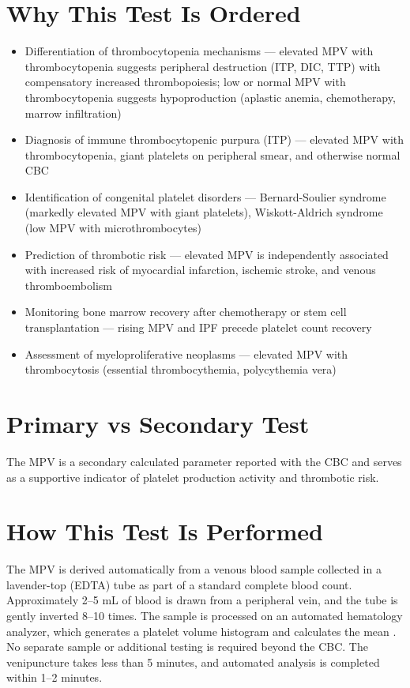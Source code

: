 \section*{Why This Test Is Ordered}
\begin{itemize}
  \item Differentiation of thrombocytopenia mechanisms --- elevated MPV with thrombocytopenia suggests peripheral destruction (ITP, DIC, TTP) with compensatory increased thrombopoiesis; low or normal MPV with thrombocytopenia suggests hypoproduction (aplastic anemia, chemotherapy, marrow infiltration)
  \item Diagnosis of immune thrombocytopenic purpura (ITP) --- elevated MPV with thrombocytopenia, giant platelets on peripheral smear, and otherwise normal CBC
  \item Identification of congenital platelet disorders --- Bernard-Soulier syndrome (markedly elevated MPV with giant platelets), Wiskott-Aldrich syndrome (low MPV with microthrombocytes)
  \item Prediction of thrombotic risk --- elevated MPV is independently associated with increased risk of myocardial infarction, ischemic stroke, and venous thromboembolism \cite{sansanayudh2014mean}
  \item Monitoring bone marrow recovery after chemotherapy or stem cell transplantation --- rising MPV and IPF precede platelet count recovery
  \item Assessment of myeloproliferative neoplasms --- elevated MPV with thrombocytosis (essential thrombocythemia, polycythemia vera)
\end{itemize}

\section*{Primary vs Secondary Test}
The MPV is a secondary calculated parameter reported with the CBC and serves as a supportive indicator of platelet production activity and thrombotic risk.

\section*{How This Test Is Performed}
The MPV is derived automatically from a venous blood sample collected in a lavender-top (EDTA) tube as part of a standard complete blood count. Approximately 2--5 mL of blood is drawn from a peripheral vein, and the tube is gently inverted 8--10 times. The sample is processed on an automated hematology analyzer, which generates a platelet volume histogram and calculates the mean \cite{fischbach2023manual}. No separate sample or additional testing is required beyond the CBC. The venipuncture takes less than 5 minutes, and automated analysis is completed within 1--2 minutes.

